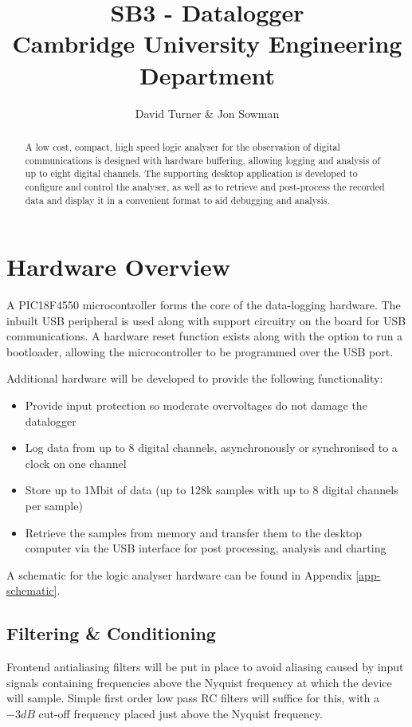 \documentclass[11pt]{article}
\title{SB3 - Datalogger\\Cambridge University Engineering Department}
\author{David Turner \& Jon Sowman}
\begin{document}
    \maketitle
	
\begin{abstract}
    A low cost, compact, high speed logic analyser for the observation of digital communications is designed with hardware buffering, allowing logging and analysis of up to eight digital channels. The supporting desktop application is developed to configure and control the analyser, as well as to retrieve and post-process the recorded data and display it in a convenient format to aid debugging and analysis.
\end{abstract}

\section{Hardware Overview}
    A PIC18F4550 microcontroller forms the core of the data-logging hardware. The inbuilt USB peripheral is used along with support circuitry on the board for USB communications. A hardware reset function exists along with the option to run a bootloader, allowing the microcontroller to be programmed over the USB port.

    Additional hardware will be developed to provide the following functionality:
    \begin{itemize}
    \item Provide input protection so moderate overvoltages do not damage the datalogger
    \item Log data from up to 8 digital channels, asynchronously or synchronised to a clock on one channel
    \item Store up to 1Mbit of data (up to 128k samples with up to 8 digital channels per sample)
    \item Retrieve the samples from memory and transfer them to the desktop computer via the USB interface for post processing, analysis and charting
    \end{itemize}

    A schematic for the logic analyser hardware can be found in Appendix
    \ref{app-schematic}.

    \subsection{Filtering \& Conditioning}
    Frontend antialiasing filters will be put in place to avoid aliasing caused by input signals containing frequencies above the Nyquist frequency at which the device will sample. Simple first order low pass RC filters will suffice for this, with a $-3dB$ cut-off frequency placed just above the Nyquist frequency.
\end{document}
